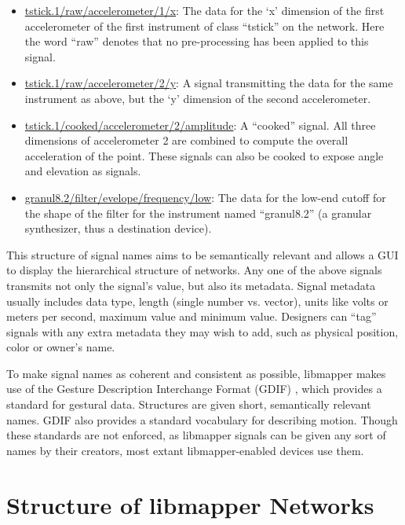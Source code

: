 	\begin{itemize}
	\item\url{tstick.1/raw/accelerometer/1/x}: The data for the `x' dimension of the first accelerometer of the first instrument of class ``tstick'' on the network. Here the word ``raw'' denotes that no pre-processing has been applied to this signal. 
	\item\url{tstick.1/raw/accelerometer/2/y}: A signal transmitting the data for the same instrument as above, but the `y' dimension of the second accelerometer.
	\item\url{tstick.1/cooked/accelerometer/2/amplitude}: A ``cooked'' signal. All three dimensions of accelerometer 2 are combined to compute the overall acceleration of the point. These signals can also be cooked to expose angle and elevation as signals.
	\item\url{granul8.2/filter/evelope/frequency/low}: The data for the low-end cutoff for the shape of the filter for the instrument named ``granul8.2'' (a granular synthesizer, thus a destination device).
	\end{itemize}

This structure of signal names aims to be semantically relevant and allows a GUI to display the hierarchical structure of networks. Any one of the above signals transmits not only the signal's value, but also its metadata. Signal metadata usually includes data type, length (single number vs. vector), units like volts or meters per second, maximum value and minimum value. Designers can ``tag'' signals with any extra metadata they may wish to add, such as physical position, color or owner's name. 

To make signal names as coherent and consistent as possible, libmapper makes use of the Gesture Description Interchange Format (GDIF) , which provides a standard for gestural data. Structures are given short, semantically relevant names. GDIF also provides a standard vocabulary for describing motion. Though these standards are not enforced, as libmapper signals can be given any sort of names by their creators, most extant libmapper-enabled devices use them.


	\section{Structure of libmapper Networks} %
	\label{sec:structure_of_libmapper_networks}

